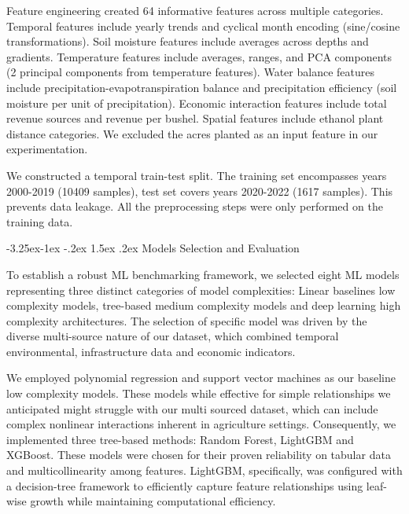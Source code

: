 \documentclass[10pt,twocolumn]{article}
\makeatletter
\renewcommand\subsection{\@startsection{subsection}{2}{\z@}%
  {-3.25ex\@plus -1ex \@minus -.2ex}%
  {1.5ex \@plus .2ex}%
  {\normalfont\normalsize\bfseries}}
\makeatother
\begin{document}
Feature engineering created 64 informative features across multiple categories.
Temporal features include yearly trends and cyclical month encoding (sine/cosine transformations).
Soil moisture features include averages across depths and gradients.
Temperature features include averages, ranges, and PCA components (2 principal components from temperature features).
Water balance features include precipitation-evapotranspiration balance and precipitation efficiency (soil moisture per unit of precipitation).
Economic interaction features include total revenue sources and revenue per bushel.
Spatial features include ethanol plant distance categories.
We excluded the acres planted as an input feature in our experimentation.

We constructed a temporal train-test split.
The training set encompasses years 2000-2019 (\num{10409} samples), test set covers years 2020-2022 (\num{1617} samples).
This prevents data leakage.
All the preprocessing steps were only performed on the training data.

\subsection{Models Selection and Evaluation}

To establish a robust ML benchmarking framework, we selected eight ML models representing three distinct categories of model complexities: Linear baselines low complexity models, tree-based medium complexity models and deep learning high complexity architectures.
The selection of specific model was driven by the diverse multi-source nature of our dataset, which combined temporal environmental, infrastructure data and economic indicators.

We employed polynomial regression and support vector machines as our baseline low complexity models.
These models while effective for simple relationships we anticipated might struggle with our multi sourced dataset, which can include complex nonlinear interactions inherent in agriculture settings.
Consequently, we implemented three tree-based methods: Random Forest, LightGBM and XGBoost.
These models were chosen for their proven reliability on tabular data and multicollinearity among features.
LightGBM, specifically, was configured with a decision-tree framework to efficiently capture feature relationships using leaf-wise growth while maintaining computational efficiency.
\end{document}
